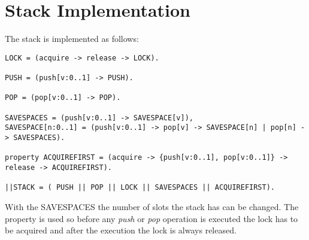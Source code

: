 \documentclass{report}
\begin{document}
	\section{Stack Implementation}
	\startsection
		The stack is implemented as follows:
		\startsubsection
			\begin{verbatim}
LOCK = (acquire -> release -> LOCK).

PUSH = (push[v:0..1] -> PUSH).

POP = (pop[v:0..1] -> POP).

SAVESPACES = (push[v:0..1] -> SAVESPACE[v]),
SAVESPACE[n:0..1] = (push[v:0..1] -> pop[v] -> SAVESPACE[n] | pop[n] -> SAVESPACES).

property ACQUIREFIRST = (acquire -> {push[v:0..1], pop[v:0..1]} -> release -> ACQUIREFIRST).

||STACK = ( PUSH || POP || LOCK || SAVESPACES || ACQUIREFIRST).
			\end{verbatim}
		\closesection
		With the SAVESPACES the number of slots the stack has can be changed. The property is used  so before any \textit{push} or \textit{pop} operation is executed the lock has to be acquired and after the execution the lock is always released.
	\closesection
\end{document}
